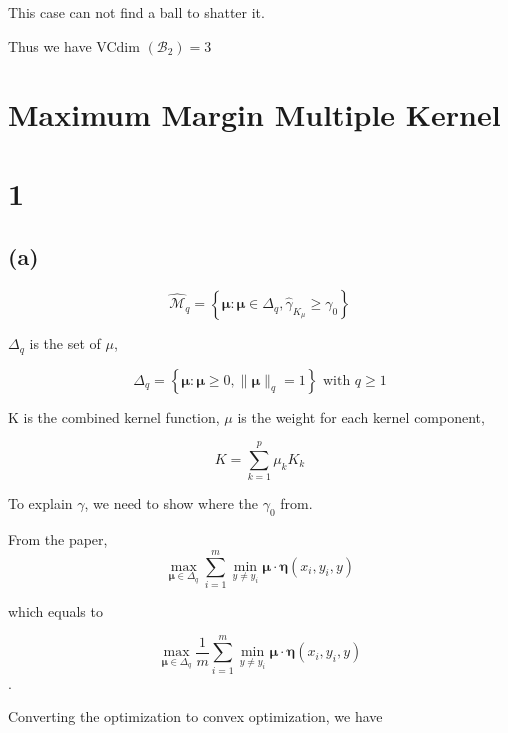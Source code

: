 \documentclass{article}
\begin{document}
This case can not find a ball to shatter it.

Thus we have VCdim $\left(\mathcal{B}_{2}\right) = 3$

\section*{Maximum Margin Multiple Kernel}
\section*{1}
\subsection*{(a)}

\begin{equation}
    \widehat{\mathcal{M}}_{q}=\left\{\boldsymbol{\mu}: \boldsymbol{\mu} \in \Delta_{q}, \widehat{\gamma}_{K_{\mu}} \geq \gamma_{0}\right\}
\end{equation}

$\Delta_q$ is the set of $\mu$,

\begin{equation}
    \Delta_{q}=\left\{\boldsymbol{\mu}: \boldsymbol{\mu} \geq 0,\|\boldsymbol{\mu}\|_{q}=1\right\} \text { with } q \geq 1
\end{equation}

K is the combined kernel function, $\mu$ is the weight for each kernel component,

\begin{equation}
    K = \sum_{k=1}^{p} \mu_{k} K_{k}
\end{equation}

To explain $\gamma$, we need to show where the $\gamma_0$ from.

From the paper,
\begin{equation}
    \max _{\boldsymbol{\mu} \in \Delta_{q}} \sum_{i=1}^{m} \min _{y \neq y_{i}} \boldsymbol{\mu} \cdot \boldsymbol{\eta}\left(x_{i}, y_{i}, y\right)
\end{equation}

which equals to

\begin{equation}
    \max _{\boldsymbol{\mu} \in \Delta_{q}} \frac{1}{m} \sum_{i=1}^{m} \min _{y \neq y_{i}} \boldsymbol{\mu} \cdot \boldsymbol{\eta}\left(x_{i}, y_{i}, y\right)
\end{equation}.

Converting the optimization to convex optimization, we have
\end{document}
